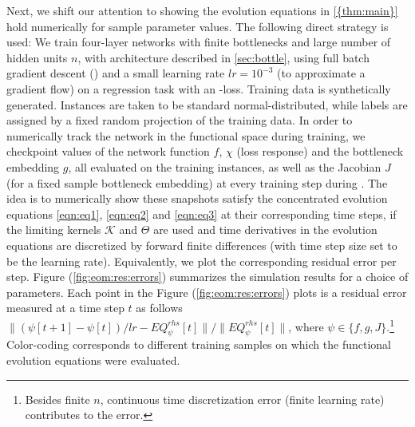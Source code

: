 \documentclass{article}
\theoremstyle{definition}
\theoremstyle{remark}
\renewcommand{\[}{\begin{eqnarray}}
\renewcommand{\]}{\end{eqnarray}}
\renewcommand{\[}{\begin{eqnarray}}
\renewcommand{\]}{\end{eqnarray}}
\begin{document}
Next, we shift our attention to showing the evolution equations in \cref{{thm:main}} hold numerically for sample parameter values. The following direct strategy is used: We train four-layer  networks with finite bottlenecks and large number of hidden units $n$, with architecture described in \cref{sec:bottle}, using full batch gradient descent () and a small learning rate $lr=10^{-3}$ (to approximate a gradient flow) on a regression task with an -loss. Training data is synthetically generated. Instances are taken to be standard normal-distributed, while labels are assigned by a fixed random projection of the training data. In order to numerically track the network in the functional space during training, we checkpoint values of the network function $f$, $\chi$ (loss response) and the bottleneck embedding $g$, all evaluated on the training instances, as well as the Jacobian $J$ (for a fixed sample bottleneck embedding) at every training step during . The idea is to numerically show these snapshots satisfy the concentrated evolution equations \cref{eqn:eq1}, \cref{eqn:eq2} and \cref{eqn:eq3} at their corresponding time steps, if the  limiting  kernels $\mathcal{K}$ and $\Theta$ are used and time derivatives in the evolution equations are discretized by forward finite differences (with time step size set to be the learning rate). Equivalently, we plot the corresponding residual error per step. Figure (\ref{fig:eom:res:errors}) summarizes the simulation results for a choice of parameters.  Each point in the Figure (\ref{fig:eom:res:errors}) plots is a residual error measured at a time step $t$ as follows $\lVert (\psi[t+1]-\psi[t])/lr-EQ_{\psi}^{rhs}[t]\rVert/\lVert EQ_{\psi}^{rhs}[t]\rVert$, where $\psi\in\{f, g, J\}$.\footnote{Besides finite $n$, continuous time discretization error (finite learning rate) contributes to the error.} Color-coding corresponds to different training samples on which the functional evolution equations were evaluated.
\end{document}
